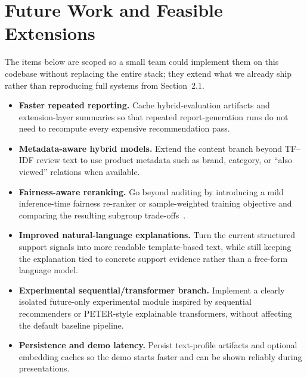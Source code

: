 \documentclass[sigconf,nonacm]{acmart}
\begin{document}
\section{Future Work and Feasible Extensions}
\label{sec:future}
The items below are scoped so a small team could implement them on this codebase without replacing the entire stack; they extend what we already ship rather than reproducing full systems from Section~2.1.

\begin{itemize}
  \item \textbf{Faster repeated reporting.} Cache hybrid-evaluation artifacts and extension-layer summaries so that repeated report-generation runs do not need to recompute every expensive recommendation pass.
  \item \textbf{Metadata-aware hybrid models.} Extend the content branch beyond TF--IDF review text to use product metadata such as brand, category, or ``also viewed'' relations when available.
  \item \textbf{Fairness-aware reranking.} Go beyond auditing by introducing a mild inference-time fairness re-ranker or sample-weighted training objective and comparing the resulting subgroup trade-offs~\cite{li2021userfairness}.
  \item \textbf{Improved natural-language explanations.} Turn the current structured support signals into more readable template-based text, while still keeping the explanation tied to concrete support evidence rather than a free-form language model.
  \item \textbf{Experimental sequential/transformer branch.} Implement a clearly isolated future-only experimental module inspired by sequential recommenders or PETER-style explainable transformers, without affecting the default baseline pipeline.
  \item \textbf{Persistence and demo latency.} Persist text-profile artifacts and optional embedding caches so the demo starts faster and can be shown reliably during presentations.
\end{itemize}
\end{document}
